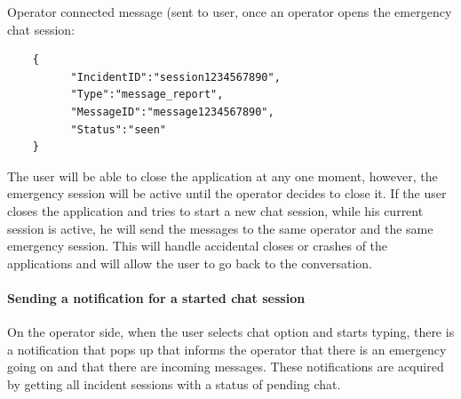 \documentclass{article}
\begin{document}
Operator connected message (sent to user, once an operator opens the emergency chat session:
\begin{lstlisting}
	{
          "IncidentID":"session1234567890",
          "Type":"message_report",
          "MessageID":"message1234567890",
          "Status":"seen"
	}
\end{lstlisting}
The user will be able to close the application at any one moment, however, the emergency session will be active until the operator decides to close it. If the user closes the application and tries to start a new chat session, while his current session is active, he will send the messages to the same operator and the same emergency session. This will handle accidental closes or crashes of the applications and will allow the user to go back to the conversation.

\paragraph{Sending a notification for a started chat session}
On the operator side, when the user selects chat option and starts typing, there is a notification that pops up that informs the operator that there is an emergency going on and that there are incoming messages. These notifications are acquired by getting all incident sessions with a status of pending chat.
\end{document}
